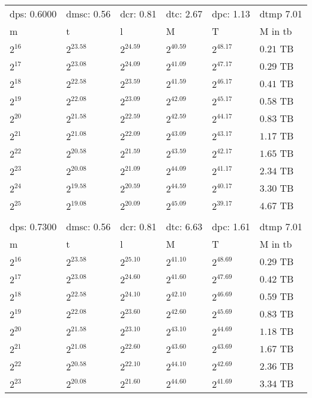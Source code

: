 \begin{tabular}{llllll}
dps: 0.6000 & dmsc: 0.56 & dcr: 0.81 & dtc: 2.67 & dpc: 1.13 & dtmp 7.01 \\
m & t & l & M & T & M in tb \\
$2^{16}$ & $2^{23.58}$ & $2^{24.59}$ & $2^{40.59}$ & $2^{48.17}$ & $0.21$ TB \\
$2^{17}$ & $2^{23.08}$ & $2^{24.09}$ & $2^{41.09}$ & $2^{47.17}$ & $0.29$ TB \\
$2^{18}$ & $2^{22.58}$ & $2^{23.59}$ & $2^{41.59}$ & $2^{46.17}$ & $0.41$ TB \\
$2^{19}$ & $2^{22.08}$ & $2^{23.09}$ & $2^{42.09}$ & $2^{45.17}$ & $0.58$ TB \\
$2^{20}$ & $2^{21.58}$ & $2^{22.59}$ & $2^{42.59}$ & $2^{44.17}$ & $0.83$ TB \\
$2^{21}$ & $2^{21.08}$ & $2^{22.09}$ & $2^{43.09}$ & $2^{43.17}$ & $1.17$ TB \\
$2^{22}$ & $2^{20.58}$ & $2^{21.59}$ & $2^{43.59}$ & $2^{42.17}$ & $1.65$ TB \\
$2^{23}$ & $2^{20.08}$ & $2^{21.09}$ & $2^{44.09}$ & $2^{41.17}$ & $2.34$ TB \\
$2^{24}$ & $2^{19.58}$ & $2^{20.59}$ & $2^{44.59}$ & $2^{40.17}$ & $3.30$ TB \\
$2^{25}$ & $2^{19.08}$ & $2^{20.09}$ & $2^{45.09}$ & $2^{39.17}$ & $4.67$ TB \\
 &  &  &  &  &  \\
dps: 0.7300 & dmsc: 0.56 & dcr: 0.81 & dtc: 6.63 & dpc: 1.61 & dtmp 7.01 \\
m & t & l & M & T & M in tb \\
$2^{16}$ & $2^{23.58}$ & $2^{25.10}$ & $2^{41.10}$ & $2^{48.69}$ & $0.29$ TB \\
$2^{17}$ & $2^{23.08}$ & $2^{24.60}$ & $2^{41.60}$ & $2^{47.69}$ & $0.42$ TB \\
$2^{18}$ & $2^{22.58}$ & $2^{24.10}$ & $2^{42.10}$ & $2^{46.69}$ & $0.59$ TB \\
$2^{19}$ & $2^{22.08}$ & $2^{23.60}$ & $2^{42.60}$ & $2^{45.69}$ & $0.83$ TB \\
$2^{20}$ & $2^{21.58}$ & $2^{23.10}$ & $2^{43.10}$ & $2^{44.69}$ & $1.18$ TB \\
$2^{21}$ & $2^{21.08}$ & $2^{22.60}$ & $2^{43.60}$ & $2^{43.69}$ & $1.67$ TB \\
$2^{22}$ & $2^{20.58}$ & $2^{22.10}$ & $2^{44.10}$ & $2^{42.69}$ & $2.36$ TB \\
$2^{23}$ & $2^{20.08}$ & $2^{21.60}$ & $2^{44.60}$ & $2^{41.69}$ & $3.34$ TB \\

\end{tabular}
